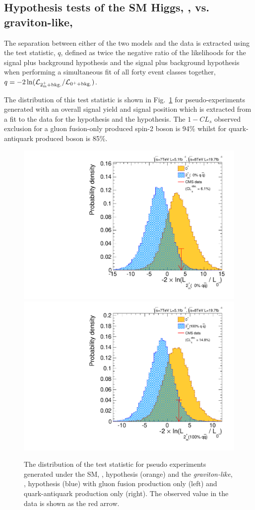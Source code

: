 \subsection{Hypothesis tests of the SM Higgs, \zerop, vs. graviton-like, \twomp}
\label{sec:spin_separation}

The separation between either of the two models and the data is extracted using the test statistic, $q$, defined as twice the negative ratio 
of the likelihoods for the \zerop signal plus background hypothesis and the \twomp signal plus background hypothesis when 
performing a simultaneous fit of all forty event classes together, $q=-2\,{\ln({\cal L}_{2^{+}_\mathrm{m} + \mathrm{bkg.}}/{\cal
L}_{0^+ + \mathrm{bkg.}})}$.

The distribution of this test statistic is shown in 
Fig.~\ref{fig:separation} for pseudo-experiments generated with an overall signal yield and signal position which is extracted from a fit to the data for
the \zerop hypothesis 
and the \twomp hypothesis. The $1-CL_{s}$ observed exclusion for a gluon fusion-only produced spin-2 boson is 94\% whilst for quark-antiquark produced boson is 85\%. 

\begin{figure}
  \begin{center}
    \includegraphics[width=0.49\linewidth]{results/plots/2pm0.pdf}
    \includegraphics[width=0.49\linewidth]{results/plots/2pm1.pdf}
    \caption[Distributions of the test statistic for different spin hypotheses compared to the \acs{SM}]{The distribution of the test statistic for pseudo experiments generated under the SM, \zerop, hypothesis (orange) and the \emph{graviton-like}, \twomp, hypothesis (blue) with gluon fusion production only (left) and quark-antiquark production only (right). The observed value in the data is shown as the red arrow.}
    \label{fig:separation}
  \end{center}
\end{figure}

